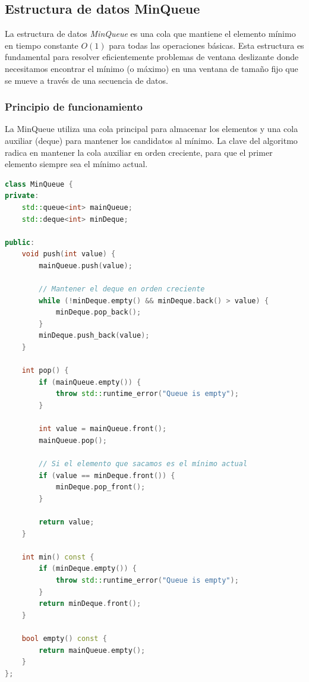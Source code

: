 \documentclass[12pt,a4paper]{article}
\begin{document}
\subsection{Estructura de datos MinQueue}

La estructura de datos \textit{MinQueue} es una cola que mantiene el elemento mínimo en tiempo constante $O(1)$ para todas las operaciones básicas. Esta estructura es fundamental para resolver eficientemente problemas de ventana deslizante donde necesitamos encontrar el mínimo (o máximo) en una ventana de tamaño fijo que se mueve a través de una secuencia de datos.

\subsubsection{Principio de funcionamiento}

La MinQueue utiliza una cola principal para almacenar los elementos y una cola auxiliar (deque) para mantener los candidatos al mínimo. La clave del algoritmo radica en mantener la cola auxiliar en orden creciente, para que el primer elemento siempre sea el mínimo actual.

\begin{lstlisting}[language=C++, label=lst:minqueue_simple]
class MinQueue {
private:
    std::queue<int> mainQueue;
    std::deque<int> minDeque;

public:
    void push(int value) {
        mainQueue.push(value);
        
        // Mantener el deque en orden creciente
        while (!minDeque.empty() && minDeque.back() > value) {
            minDeque.pop_back();
        }
        minDeque.push_back(value);
    }
    
    int pop() {
        if (mainQueue.empty()) {
            throw std::runtime_error("Queue is empty");
        }
        
        int value = mainQueue.front();
        mainQueue.pop();
        
        // Si el elemento que sacamos es el mínimo actual
        if (value == minDeque.front()) {
            minDeque.pop_front();
        }
        
        return value;
    }
    
    int min() const {
        if (minDeque.empty()) {
            throw std::runtime_error("Queue is empty");
        }
        return minDeque.front();
    }
    
    bool empty() const {
        return mainQueue.empty();
    }
};
\end{lstlisting}
\end{document}
